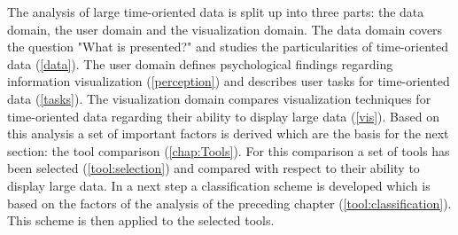 The analysis of large time-oriented data is split up into three parts: the data domain,  the user domain and the visualization domain. The data domain covers the question "What is presented?" and studies the particularities of time-oriented data (\ref{data}). The user domain defines psychological findings regarding information visualization  (\ref{perception}) and describes user tasks for time-oriented data (\ref{tasks}). The visualization domain compares visualization techniques for time-oriented data regarding their ability to display large data (\ref{vis}). Based on this analysis a set of important factors is derived which are the basis for the next section: the tool comparison (\ref{chap:Tools}). For this comparison a set of tools has been selected (\ref{tool:selection}) and compared with respect to their ability to display large data. In a next step a classification scheme is developed which is based on the factors of the analysis of the preceding chapter (\ref{tool:classification}). This scheme is then applied to the selected tools.
